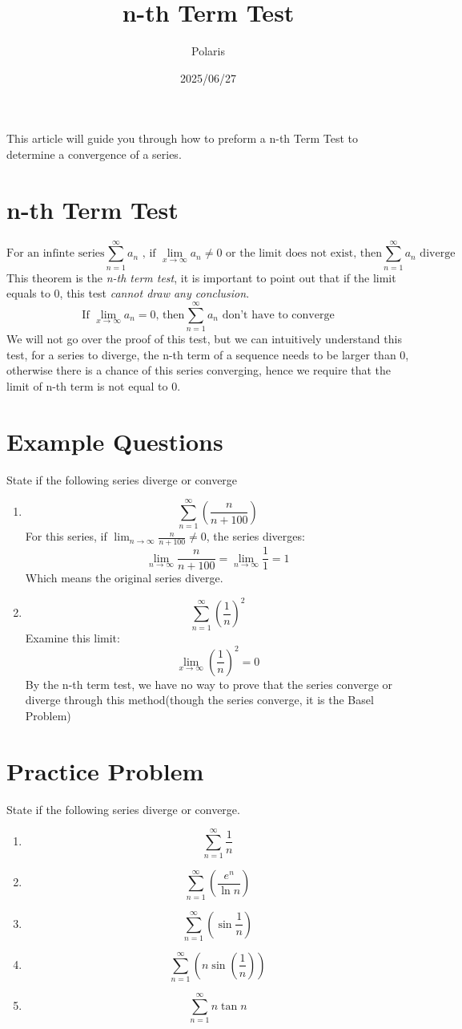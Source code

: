 \documentclass{article}
\title{n-th Term Test}
\author{Polaris}
\date{2025/06/27}
\numberwithin{equation}{section}
\begin{document}
\maketitle
This article will guide you through how to preform a n-th Term Test to determine a convergence of a series.

\section{n-th Term Test}
\[
    \text{For an infinte series} \sum_{n = 1}^{\infty} a_n \text{ , if }\lim_{x\to \infty} a_n \neq 0 \text{ or the limit does not exist, then} \sum_{n = 1}^{\infty} a_n \text{ diverge}
\]
This theorem is the \emph{n-th term test}, it is important to point out that if the limit equals to $0$, this test \emph{cannot draw any conclusion}.
\[
    \text{If } \lim_{x\to \infty} a_n = 0  \text{, then} \sum_{n = 1}^{\infty} a_n \text{ don't have to converge}
\]
We will not go over the proof of this test, but we can intuitively understand this test, for a series to diverge, the n-th term of a sequence 
needs to be larger than $0$, otherwise there is a chance of this series converging, hence we require that the limit of n-th term is not equal to $0$.
\section{Example Questions}
State if the following series diverge or converge
\begin{enumerate}
    \item \[\sum_{n = 1}^{\infty} \left(\frac{n}{n + 100}\right)\]
    For this series, if $\displaystyle\lim_{n\to \infty} \frac{n}{n+100} \neq 0$, the series diverges:
    \[
        \lim_{n\to \infty} \frac{n}{n+100} = \lim_{n\to \infty} \frac{1}{1} = 1
    \]
    Which means the original series diverge.

    \item \[\sum_{n = 1}^{\infty} \left(\frac{1}{n}\right)^2\]
    Examine this limit: 
    \[
        \lim_{x\to \infty} \left(\frac{1}{n}\right)^2 = 0
    \]
    By the n-th term test, we have no way to prove that the series converge or diverge through this method(though the series converge, it is the Basel Problem)
\end{enumerate}

\section{Practice Problem}
State if the following series diverge or converge.
\begin{enumerate}
    \item \[\sum_{n=1}^{\infty}\frac{1}{n}\]
    \item \[\sum_{n=1}^{\infty} \left(\frac{e^n}{\ln n}\right)\]
    \item \[\sum_{n=1}^{\infty} \left(\sin \frac{1}{n}\right)\]
    \item \[\sum_{n=1}^{\infty} \left(n\sin \left(\frac{1}{n}\right)\right)\]
    \item \[\sum_{n=1}^{\infty} n\tan n\]
\end{enumerate}
\end{document}
